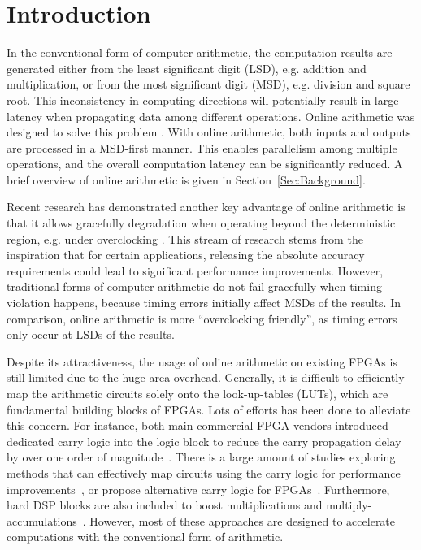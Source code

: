 \documentclass[conference]{IEEEtran}
\begin{document}
\section{Introduction}\label{Sec:Intro}
In the conventional form of computer arithmetic, the computation results are generated either from the least significant digit (LSD), e.g. addition and multiplication, or from the most significant digit (MSD), e.g. division and square root. This inconsistency in computing directions will potentially result in large latency when propagating data among different operations. Online arithmetic was designed to solve this problem \cite{Ercegovac_OnlineOverview,Ercegovac_Book}. With online arithmetic, both inputs and outputs are processed in a MSD-first manner. This enables parallelism among multiple operations, and the overall computation latency can be significantly reduced. A brief overview of online arithmetic is given in Section~\ref{Sec:Background}.

Recent research has demonstrated another key advantage of online arithmetic is that it allows gracefully degradation when operating beyond the deterministic region, e.g. under overclocking \cite{SKDAC14}. This stream of research stems from the inspiration that for certain applications, releasing the absolute accuracy requirements could lead to significant performance improvements. However, traditional forms of computer arithmetic do not fail gracefully when timing violation happens, because timing errors initially affect MSDs of the results. In comparison, online arithmetic is more ``overclocking friendly'', as timing errors only occur at LSDs of the results.

Despite its attractiveness, the usage of online arithmetic on existing FPGAs is still limited due to the huge area overhead. Generally, it is difficult to efficiently map the arithmetic circuits solely onto the look-up-tables (LUTs), which are fundamental building blocks of FPGAs. Lots of efforts has been done to alleviate this concern. For instance, both main commercial FPGA vendors introduced dedicated carry logic into the logic block to reduce the carry propagation delay by over one order of magnitude~\cite{Virtex6}. There is a large amount of studies exploring methods that can effectively map circuits using the carry logic for performance improvements~\cite{FPL10_FPGA_CarryChain,Prefix_CarryChain}, or propose alternative carry logic for FPGAs~\cite{FPGA_CarryChain_New1,FPGA_CarryChain_New2}. Furthermore, hard DSP blocks are also included to boost multiplications and multiply-accumulations~\cite{XilinxDSP}. However, most of these approaches are designed to accelerate computations with the conventional form of arithmetic.
\end{document}
